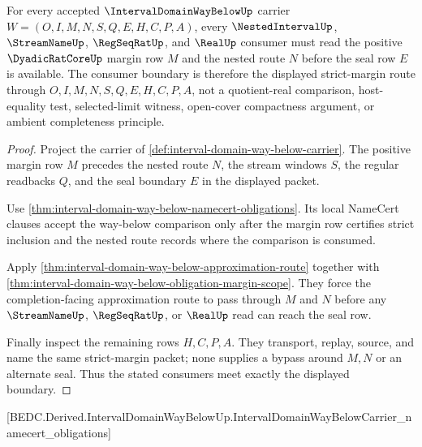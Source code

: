 \begin{theorem}
\label{thm:interval-domain-way-below-consumer-boundary}
For every accepted $\IntervalDomainWayBelowUp$ carrier
$W=(O,I,M,N,S,Q,E,H,C,P,A)$, every $\NestedIntervalUp$,
$\StreamNameUp$, $\RegSeqRatUp$, and $\RealUp$ consumer must read the
positive $\DyadicRatCoreUp$ margin row $M$ and the nested route $N$ before
the seal row $E$ is available. The consumer boundary is therefore the
displayed strict-margin route through $O,I,M,N,S,Q,E,H,C,P,A$, not a
quotient-real comparison, host-equality test, selected-limit witness,
open-cover compactness argument, or ambient completeness principle.
\end{theorem}
\begin{proof}
Project the carrier of \autoref{def:interval-domain-way-below-carrier}. The
positive margin row $M$ precedes the nested route $N$, the stream windows $S$,
the regular readbacks $Q$, and the seal boundary $E$ in the displayed packet.

Use \autoref{thm:interval-domain-way-below-namecert-obligations}. Its local
NameCert clauses accept the way-below comparison only after the margin row
certifies strict inclusion and the nested route records where the comparison
is consumed.

Apply \autoref{thm:interval-domain-way-below-approximation-route} together
with \autoref{thm:interval-domain-way-below-obligation-margin-scope}. They
force the completion-facing approximation route to pass through $M$ and $N$
before any $\StreamNameUp$, $\RegSeqRatUp$, or $\RealUp$ read can reach the
seal row.

Finally inspect the remaining rows $H,C,P,A$. They transport, replay, source,
and name the same strict-margin packet; none supplies a bypass around $M,N$
or an alternate seal. Thus the stated consumers meet exactly the displayed
boundary.
\end{proof}

[BEDC.Derived.IntervalDomainWayBelowUp.IntervalDomainWayBelowCarrier\_namecert\_obligations]

